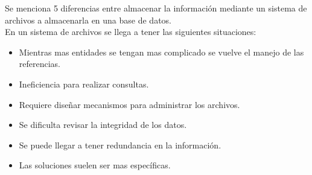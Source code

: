 \documentclass[10pt]{article}
\begin{document}
    
    
    \noindent Se menciona 5 diferencias entre almacenar la información mediante un sistema de archivos a almacenarla en una base de datos.\\
    
    En un sistema de archivos se llega a tener las siguientes situaciones:
    
    \begin{itemize}
    	
    	\item Mientras mas entidades se tengan mas complicado se vuelve el manejo de las referencias.
    	\item Ineficiencia para realizar consultas.
    	\item Requiere diseñar mecanismos para administrar los archivos.
    	\item Se dificulta revisar la integridad de los datos.
    	\item Se puede llegar a tener redundancia en la información.
    	\item Las soluciones suelen ser mas específicas.
    \end{itemize}
    
    
\end{document}
